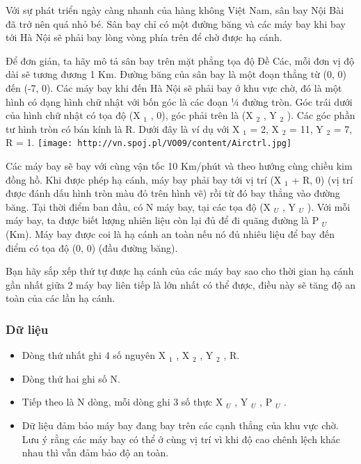 



   Với sự phát triển ngày càng nhanh của hàng không Việt Nam, sân bay Nội Bài đã trở nên quá nhỏ bé. Sân bay chỉ có một đường băng và các máy bay khi bay tới Hà Nội sẽ phải bay lòng vòng phía trên để chờ được hạ cánh.  

   Để đơn giản, ta hãy mô tả sân bay trên mặt phẳng tọa độ Đề Các, mỗi đơn vị độ dài sẽ tương đương 1 Km. Đường băng của sân bay là một đoạn thẳng từ (0, 0) đến (-7, 0). Các máy bay khi đến Hà Nội sẽ phải bay ở khu vực chờ, đó là một hình có dạng hình chữ nhật với bốn góc là các đoạn ¼ đường tròn. Góc trái dưới của hình chữ nhật có tọa độ (X   $_    1   $   , 0), góc phải trên là (X   $_    2   $   , Y   $_    2   $   ). Các góc phần tư hình tròn có bán kính là R. Dưới đây là ví dụ với X   $_    1   $   = 2, X   $_    2   $   = 11, Y   $_    2   $   = 7, R = 1.  
\texttt{[image: http://vn.spoj.pl/VO09/content/Airctrl.jpg]}

   Các máy bay sẽ bay với cùng vận tốc 10 Km/phút và theo hướng cùng chiều kim đồng hồ. Khi được phép hạ cánh, máy bay phải bay tới vị trí (X   $_    1   $   + R, 0) (vị trí được đánh dấu hình tròn màu đỏ trên hình vẽ) rồi từ đó bay thẳng vào đường băng. Tại thời điểm ban đầu, có N máy bay, tại các tọa độ (X   $_    U   $   , Y   $_    U   $   ). Với mỗi máy bay, ta được biết lượng nhiên liệu còn lại đủ để đi quãng đường là P   $_    U   $   (Km). Máy bay được coi là hạ cánh an toàn nếu nó đủ nhiêu liệu để bay đến điểm có tọa độ (0, 0) (đầu đường băng).  

   Bạn hãy sắp xếp thứ tự được hạ cánh của các máy bay sao cho thời gian hạ cánh gần nhất giữa 2 máy bay liên tiếp là lớn nhất có thể được, điều này sẽ tăng độ an toàn của các lần hạ cánh.  

\subsubsection{   Dữ liệu  }
\begin{itemize}
	\item     Dòng thứ nhất ghi 4 số nguyên X    $_     1    $    , X    $_     2    $    , Y    $_     2    $    , R.   
	\item     Dòng thứ hai ghi số N.   
	\item     Tiếp theo là N dòng, mỗi dòng ghi 3 số thực X    $_     U    $    , Y    $_     U    $    , P    $_     U    $    .   
	\item     Dữ liệu đảm bảo máy bay đang bay trên         các cạnh thẳng        của khu vực chờ. Lưu ý rằng các máy bay có thể ở cùng vị trí vì khi độ cao chênh lệch khác nhau thì vẫn đảm bảo độ an toàn.   
\end{itemize}

